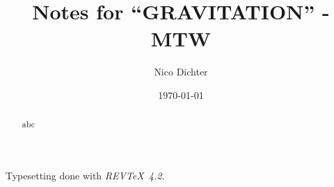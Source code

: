 \documentclass[%
reprint,
amsmath,amssymb,
aps,
pra,
floatfix,
]{revtex4-2}
\begin{document}
	\title{Notes for \enquote{GRAVITATION} - MTW}
	
	\author{Nico Dichter}
	
	
	\date{\today}
	
	\begin{abstract}
		abc
	\end{abstract}
	
	\maketitle
	
	
	
	
	
	
	
	\begin{acknowledgments}
		Typesetting done with \emph{REV\TeX\ 4.2}.
	\end{acknowledgments}
	
	
	
	
	
	
	
\end{document}
